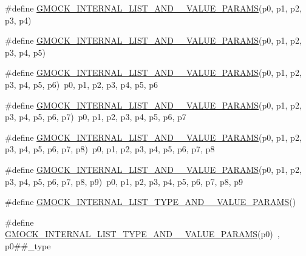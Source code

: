 \begin{DoxyCompactItemize}
\item 
\#define \mbox{\hyperlink{googletest-master_2googlemock_2include_2gmock_2gmock-generated-actions_8h_a4bfd52ebc75b6da1a84e5a59e12995fe}{G\+M\+O\+C\+K\+\_\+\+I\+N\+T\+E\+R\+N\+A\+L\+\_\+\+L\+I\+S\+T\+\_\+\+A\+N\+D\+\_\+\_\+\+V\+A\+L\+U\+E\+\_\+\+P\+A\+R\+A\+MS}}(p0,  p1,  p2,  p3,  p4)
\item 
\#define \mbox{\hyperlink{googletest-master_2googlemock_2include_2gmock_2gmock-generated-actions_8h_a553114b6d5e3f751a9f122fb71a3abdb}{G\+M\+O\+C\+K\+\_\+\+I\+N\+T\+E\+R\+N\+A\+L\+\_\+\+L\+I\+S\+T\+\_\+\+A\+N\+D\+\_\+\_\+\+V\+A\+L\+U\+E\+\_\+\+P\+A\+R\+A\+MS}}(p0,  p1,  p2,  p3,  p4,  p5)
\item 
\#define \mbox{\hyperlink{googletest-master_2googlemock_2include_2gmock_2gmock-generated-actions_8h_a6a66c76963794fca308b7e2852188e06}{G\+M\+O\+C\+K\+\_\+\+I\+N\+T\+E\+R\+N\+A\+L\+\_\+\+L\+I\+S\+T\+\_\+\+A\+N\+D\+\_\+\_\+\+V\+A\+L\+U\+E\+\_\+\+P\+A\+R\+A\+MS}}(p0,  p1,  p2,  p3,  p4,  p5,  p6)~p0, p1, p2, p3, p4, p5, p6
\item 
\#define \mbox{\hyperlink{googletest-master_2googlemock_2include_2gmock_2gmock-generated-actions_8h_af9a5e8a55b02e7afac317a2613bd29ec}{G\+M\+O\+C\+K\+\_\+\+I\+N\+T\+E\+R\+N\+A\+L\+\_\+\+L\+I\+S\+T\+\_\+\+A\+N\+D\+\_\+\_\+\+V\+A\+L\+U\+E\+\_\+\+P\+A\+R\+A\+MS}}(p0,  p1,  p2,  p3,  p4,  p5,  p6,  p7)~p0, p1, p2, p3, p4, p5, p6, p7
\item 
\#define \mbox{\hyperlink{googletest-master_2googlemock_2include_2gmock_2gmock-generated-actions_8h_a3e91ec053856b1b3c011b71810fb0992}{G\+M\+O\+C\+K\+\_\+\+I\+N\+T\+E\+R\+N\+A\+L\+\_\+\+L\+I\+S\+T\+\_\+\+A\+N\+D\+\_\+\_\+\+V\+A\+L\+U\+E\+\_\+\+P\+A\+R\+A\+MS}}(p0,  p1,  p2,  p3,  p4,  p5,  p6,  p7,  p8)~p0, p1, p2, p3, p4, p5, p6, p7, p8
\item 
\#define \mbox{\hyperlink{googletest-master_2googlemock_2include_2gmock_2gmock-generated-actions_8h_a4dbbb45245e68e2f0eaf65d273c8822c}{G\+M\+O\+C\+K\+\_\+\+I\+N\+T\+E\+R\+N\+A\+L\+\_\+\+L\+I\+S\+T\+\_\+\+A\+N\+D\+\_\+\_\+\+V\+A\+L\+U\+E\+\_\+\+P\+A\+R\+A\+MS}}(p0,  p1,  p2,  p3,  p4,  p5,  p6,  p7,  p8,  p9)~p0, p1, p2, p3, p4, p5, p6, p7, p8, p9
\item 
\#define \mbox{\hyperlink{googletest-master_2googlemock_2include_2gmock_2gmock-generated-actions_8h_a76ec2981c2b6c52e3c6cdd1eba7f37ac}{G\+M\+O\+C\+K\+\_\+\+I\+N\+T\+E\+R\+N\+A\+L\+\_\+\+L\+I\+S\+T\+\_\+\+T\+Y\+P\+E\+\_\+\+A\+N\+D\+\_\+\_\+\+V\+A\+L\+U\+E\+\_\+\+P\+A\+R\+A\+MS}}()
\item 
\#define \mbox{\hyperlink{googletest-master_2googlemock_2include_2gmock_2gmock-generated-actions_8h_aa6b8f71158f750363cbf016eb92e0865}{G\+M\+O\+C\+K\+\_\+\+I\+N\+T\+E\+R\+N\+A\+L\+\_\+\+L\+I\+S\+T\+\_\+\+T\+Y\+P\+E\+\_\+\+A\+N\+D\+\_\+\_\+\+V\+A\+L\+U\+E\+\_\+\+P\+A\+R\+A\+MS}}(p0)~, p0\#\#\+\_\+type

\end{DoxyCompactItemize}
